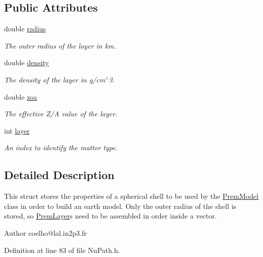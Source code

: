 \subsection*{Public Attributes}
\begin{DoxyCompactItemize}
\item 
double \hyperlink{structOscProb_1_1PremLayer_a39b409c20fd96a7a0bd421567c00ffed}{radius}
\begin{DoxyCompactList}\small\item\em The outer radius of the layer in km. \end{DoxyCompactList}\item 
double \hyperlink{structOscProb_1_1PremLayer_aba2536cbdab87d0db33df47f95c4f2c3}{density}
\begin{DoxyCompactList}\small\item\em The density of the layer in g/cm$^\wedge$3. \end{DoxyCompactList}\item 
double \hyperlink{structOscProb_1_1PremLayer_a8687a8169d786fca79908292d11077f5}{zoa}
\begin{DoxyCompactList}\small\item\em The effective Z/A value of the layer. \end{DoxyCompactList}\item 
int \hyperlink{structOscProb_1_1PremLayer_aca8d7df68e6f982155b68b7e6a7ef389}{layer}
\begin{DoxyCompactList}\small\item\em An index to identify the matter type. \end{DoxyCompactList}\end{DoxyCompactItemize}


\subsection{Detailed Description}
This struct stores the properties of a spherical shell to be used by the \hyperlink{classOscProb_1_1PremModel}{Prem\+Model} class in order to build an earth model. Only the outer radius of the shell is stored, so \hyperlink{structOscProb_1_1PremLayer}{Prem\+Layer}\textquotesingle{}s need to be assembled in order inside a vector.

\begin{DoxyAuthor}{Author}
coelho@lal.\+in2p3.\+fr 
\end{DoxyAuthor}


Definition at line 83 of file Nu\+Path.\+h.



